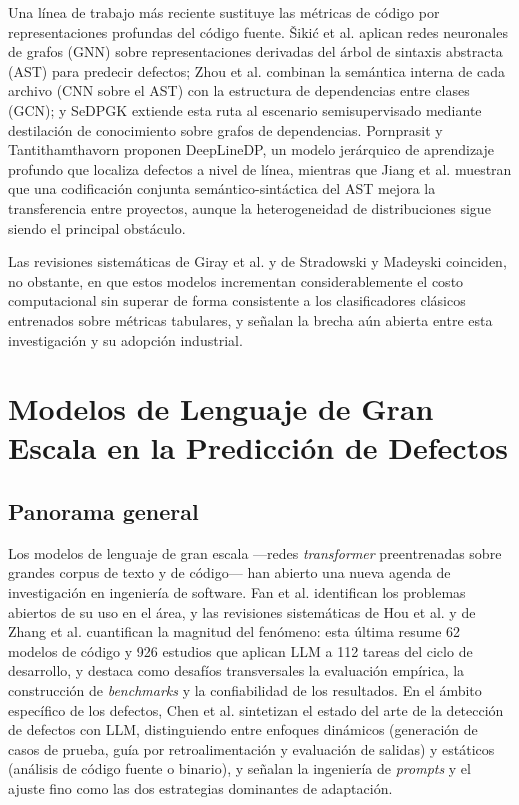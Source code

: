 Una línea de trabajo más reciente sustituye las métricas de código por representaciones profundas del código fuente. Šikić et al. \cite{sikic2022} aplican redes neuronales de grafos (GNN) sobre representaciones derivadas del árbol de sintaxis abstracta (AST) para predecir defectos; Zhou et al. \cite{zhou2022} combinan la semántica interna de cada archivo (CNN sobre el AST) con la estructura de dependencias entre clases (GCN); y SeDPGK \cite{liu2024sedpgk} extiende esta ruta al escenario semisupervisado mediante destilación de conocimiento sobre grafos de dependencias. Pornprasit y Tantithamthavorn \cite{pornprasit2023} proponen DeepLineDP, un modelo jerárquico de aprendizaje profundo que localiza defectos a nivel de línea, mientras que Jiang et al. \cite{jiang2024} muestran que una codificación conjunta semántico-sintáctica del AST mejora la transferencia entre proyectos, aunque la heterogeneidad de distribuciones sigue siendo el principal obstáculo.

Las revisiones sistemáticas de Giray et al. \cite{giray2023} y de Stradowski y Madeyski \cite{stradowski2023} coinciden, no obstante, en que estos modelos incrementan considerablemente el costo computacional sin superar de forma consistente a los clasificadores clásicos entrenados sobre métricas tabulares, y señalan la brecha aún abierta entre esta investigación y su adopción industrial.

\section{Modelos de Lenguaje de Gran Escala en la Predicción de Defectos}

\subsection{Panorama general}

Los modelos de lenguaje de gran escala ---redes \textit{transformer} preentrenadas sobre grandes corpus de texto y de código--- han abierto una nueva agenda de investigación en ingeniería de software. Fan et al. \cite{fan2023} identifican los problemas abiertos de su uso en el área, y las revisiones sistemáticas de Hou et al. \cite{hou2024} y de Zhang et al. \cite{zhang2026llm4se} cuantifican la magnitud del fenómeno: esta última resume 62 modelos de código y 926 estudios que aplican LLM a 112 tareas del ciclo de desarrollo, y destaca como desafíos transversales la evaluación empírica, la construcción de \textit{benchmarks} y la confiabilidad de los resultados. En el ámbito específico de los defectos, Chen et al. \cite{chen2026llm} sintetizan el estado del arte de la detección de defectos con LLM, distinguiendo entre enfoques dinámicos (generación de casos de prueba, guía por retroalimentación y evaluación de salidas) y estáticos (análisis de código fuente o binario), y señalan la ingeniería de \textit{prompts} y el ajuste fino como las dos estrategias dominantes de adaptación.

